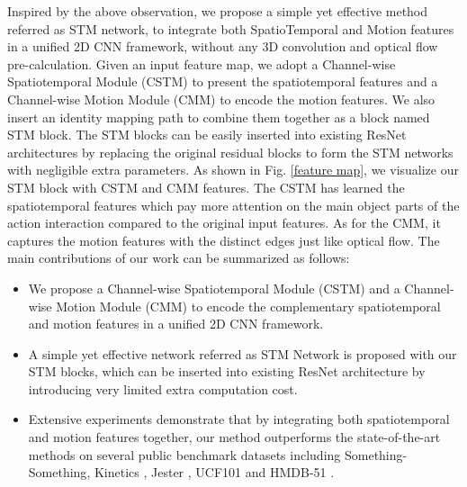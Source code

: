 \documentclass[10pt,twocolumn,letterpaper]{article}
\begin{document}
	Inspired by the above observation, we propose a simple yet effective method referred as STM network, to integrate both SpatioTemporal and Motion features in a unified 2D CNN framework, without any 3D convolution and optical flow pre-calculation. Given an input feature map, we adopt a Channel-wise Spatiotemporal Module (CSTM) to present the spatiotemporal features and a Channel-wise Motion Module (CMM) to encode the motion features. We also insert an identity mapping path to combine them together as a block named STM block. The STM blocks can be easily inserted into existing ResNet \cite{he2016deep} architectures by replacing the original residual blocks to form the STM networks with negligible extra parameters. As shown in Fig. \ref{feature map}, we visualize our STM block with CSTM and CMM features. The CSTM has learned the spatiotemporal features which pay more attention on the main object parts of the action interaction compared to the original input features. As for the CMM, it captures the motion features with the distinct edges just like optical flow. The main contributions of our work can be summarized as follows:
	\begin{itemize}
		\item We propose a Channel-wise Spatiotemporal Module (CSTM) and a Channel-wise Motion Module (CMM) to encode the complementary spatiotemporal and motion features in a unified 2D CNN framework.
		\item A simple yet effective network referred as STM Network is proposed with our STM blocks, which can be inserted into existing ResNet architecture by introducing very limited extra computation cost.
		\item Extensive experiments demonstrate that by integrating both spatiotemporal and motion features together, our method outperforms the state-of-the-art methods on several public benchmark datasets including Something-Something\cite{goyal2017something}, Kinetics \cite{carreira2017quo}, Jester \cite{jester}, UCF101 \cite{soomro2012ucf101} and HMDB-51 \cite{Kuehne11}.
	\end{itemize}

	
\end{document}
